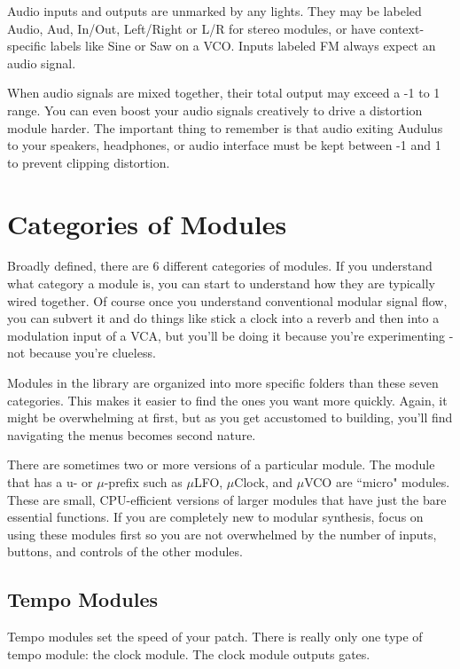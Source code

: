 \documentclass[11pt]{book}
\begin{document}
\begin{multicols*}{2}
Audio inputs and outputs are unmarked by any lights. They may be labeled Audio, Aud, In/Out, Left/Right or L/R for stereo modules, or have context-specific labels like Sine or Saw on a VCO. Inputs labeled FM always expect an audio signal.

When audio signals are mixed together, their total output may exceed a -1 to 1 range. You can even boost your audio signals creatively to drive a distortion module harder. The important thing to remember is that audio exiting Audulus to your speakers, headphones, or audio interface must be kept between -1 and 1 to prevent clipping distortion. 


\section{Categories of Modules}

Broadly defined, there are 6 different categories of modules. If you understand what category a module is, you can start to understand how they are typically wired together. Of course once you understand conventional modular signal flow, you can subvert it and do things like stick a clock into a reverb and then into a modulation input of a VCA, but you'll be doing it because you're experimenting - not because you're clueless.

Modules in the library are organized into more specific folders than these seven categories. This makes it easier to find the ones you want more quickly. Again, it might be overwhelming at first, but as you get accustomed to building, you'll find navigating the menus becomes second nature.

There are sometimes two or more versions of a particular module. The module that has a u- or $\mu$-prefix such as $\mu$LFO, $\mu$Clock, and $\mu$VCO are ``micro" modules. These are small, CPU-efficient versions of larger modules that have just the bare essential functions. If you are completely new to modular synthesis, focus on using these modules first so you are not overwhelmed by the number of inputs, buttons, and controls of the other modules.

\subsection{Tempo Modules}

Tempo modules set the speed of your patch. There is really only one type of tempo module: the clock module. The clock module outputs gates.


\end{multicols*}
\end{document}
